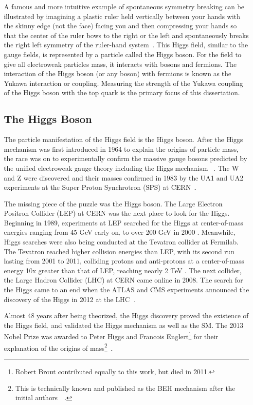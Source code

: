 A famous and more intuitive example of spontaneous symmetry breaking can be illustrated
by imagining a plastic ruler held vertically between your hands with the skinny edge (not the face) facing you and then compressing your hands so that the center of the ruler bows to the right or the left and
spontaneously breaks the right left symmetry of the ruler-hand system~\cite{robinson}.
This Higgs field, similar to the gauge fields, is represented by a particle called the Higgs boson.
For the field to give all electroweak particles mass, it interacts with bosons and fermions.
The interaction of the Higgs boson (or any boson) with fermions is known as the Yukawa interaction or coupling. Measuring the strength of the Yukawa coupling
of the Higgs boson with the top quark is the primary focus of this dissertation.

\subsection{The Higgs Boson}

The particle manifestation of the Higgs field is the Higgs boson. After the Higgs mechanism was first introduced in 1964 to explain the origins of particle mass,
the race was on to experimentally confirm the massive gauge bosons predicted by the unified electroweak gauge theory including the Higgs mechanism ~\cite{1964_prl_higgs}.
The W and Z were discovered and their masses confirmed in 1983 by the UA1 and UA2 experiments at the Super Proton Synchrotron (SPS) at CERN~\cite{UA1}\cite{UA2}\cite{Z}.

The missing piece of the puzzle was the Higgs boson. The Large Electron Positron Collider (LEP) at CERN was the next place to look for the Higgs.
Beginning in 1989, experiments at LEP searched for the Higgs at center-of-mass energies ranging from 45 GeV early on, to over 200 GeV in 2000 \cite{LEPHIGGS}. Meanwhile, Higgs
searches were also being conducted at the Tevatron collider at Fermilab. The Tevatron reached higher collision energies than LEP, with its second run lasting from 2001
to 2011, colliding protons and anti-protons at a center-of-mass energy 10x greater than that of LEP, reaching nearly 2 TeV \cite{TEVHIGGS_2010}. The next collider, the Large Hadron Collider
(LHC) at CERN came online in 2008. The search for the Higgs came to an end when the ATLAS and CMS experiments announced the discovery of the Higgs in 2012 at the LHC~\cite{cms_higgs}\cite{atlas_higgs}. 

Almost 48 years after being theorized, the Higgs discovery proved the existence
of the Higgs field, and validated the Higgs mechanism as well as the SM. The 2013 Nobel Prize was awarded to
Peter Higgs and Francois Englert\footnote{Robert Brout contributed equally to this work, but died in 2011.} for their explanation of the origins of mass\footnote{This is
technically known and published as the BEH mechanism after the initial authors~\cite{1964_prl_higgs}~\cite{1964_prl_englert}.}~\cite{NP13}.

